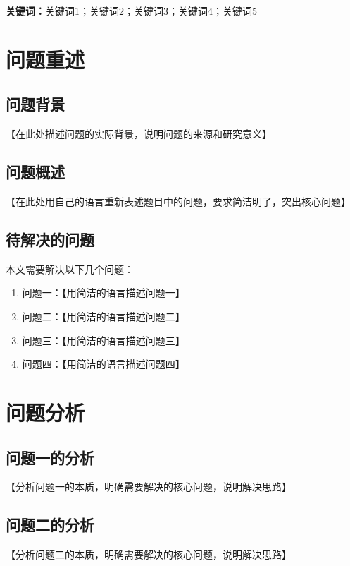 \documentclass[12pt,a4paper]{ctexart}
\begin{document}
\vspace{0.5cm}

\noindent\textbf{关键词：}关键词1；关键词2；关键词3；关键词4；关键词5

\newpage

\setcounter{page}{1}

\tableofcontents
\newpage


\section{问题重述}

\subsection{问题背景}
【在此处描述问题的实际背景，说明问题的来源和研究意义】

\subsection{问题概述}
【在此处用自己的语言重新表述题目中的问题，要求简洁明了，突出核心问题】

\subsection{待解决的问题}
本文需要解决以下几个问题：

\begin{enumerate}
    \item 问题一：【用简洁的语言描述问题一】
    \item 问题二：【用简洁的语言描述问题二】
    \item 问题三：【用简洁的语言描述问题三】
    \item 问题四：【用简洁的语言描述问题四】
\end{enumerate}

\section{问题分析}

\subsection{问题一的分析}
【分析问题一的本质，明确需要解决的核心问题，说明解决思路】

\subsection{问题二的分析}
【分析问题二的本质，明确需要解决的核心问题，说明解决思路】
\end{document}
